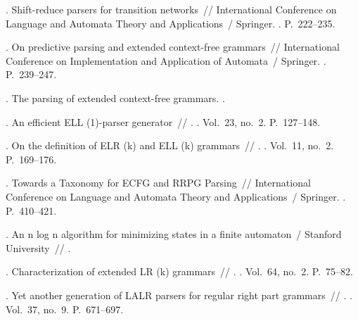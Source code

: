 \begin{thebibliography}{10}
	.
	Shift-reduce parsers for transition networks~// International Conference on
	Language and Automata Theory and Applications~/ Springer. \BibDash
	. \BibDash
	\newblock P.~222--235.
	
	. On predictive parsing and
	extended context-free grammars~// International Conference on Implementation
	and Application of Automata~/ Springer. \BibDash
	. \BibDash
	\newblock P.~239--247.
	
	. The parsing of extended
	context-free grammars. \BibDash
	.
	
	. An efficient {ELL} (1)-parser generator~//
	. \BibDash
	. \BibDash
	\newblock Vol.~23, no.~2. \BibDash
	\newblock P.~127--148.
	
	. On the definition of {ELR} (k) and {ELL} (k)
	grammars~// . \BibDash
	. \BibDash
	\newblock Vol.~11, no.~2. \BibDash
	\newblock P.~169--176.
	
	. Towards a Taxonomy for {ECFG} and {RRPG} Parsing~//
	International Conference on Language and Automata Theory and Applications~/
	Springer. \BibDash
	. \BibDash
	\newblock P.~410--421.
	
	. An n log n algorithm for minimizing states in a finite automaton~/ Stanford University~//
	.
	
	. Characterization of extended LR (k)
	grammars~// . \BibDash
	. \BibDash
	\newblock Vol.~64, no.~2. \BibDash
	\newblock P.~75--82.
	
	. Yet another generation of {LALR}
	parsers for regular right part grammars~// .
	\BibDash
	. \BibDash
	\newblock Vol.~37, no.~9. \BibDash
	\newblock P.~671--697.
	

\end{thebibliography}
